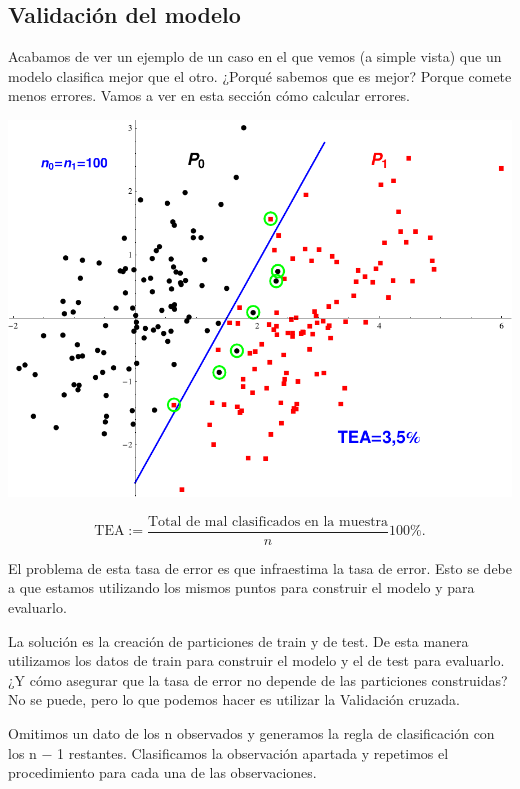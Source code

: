 \subsection{Validación del modelo}

Acabamos de ver un ejemplo de un caso en el que vemos (a simple vista) que un modelo clasifica mejor que el otro. ¿Porqué sabemos que es mejor? Porque comete menos errores. Vamos a ver en esta sección cómo calcular errores.

\centerline{{\includegraphics[width=13 cm]{pdf/tema4/_errores-1}}}

\begin{defn}
$$\text{TEA}:=\frac{\text{Total de mal clasificados en la muestra}}{n}100\%.$$
\end{defn}

El problema de esta tasa de error es que infraestima la tasa de error. Esto se debe a que estamos utilizando los mismos puntos para construir el modelo y para evaluarlo. 

La solución es la creación de particiones de train y de test. De esta manera utilizamos los datos de train para construir el modelo y el de test para evaluarlo. ¿Y cómo asegurar que la tasa de error no depende de las particiones construidas? No se puede, pero lo que podemos hacer es utilizar la Validación cruzada.

\begin{defn}Omitimos un dato de los n observados y generamos la regla de clasificación con los n − 1 restantes. Clasificamos la observación apartada y repetimos el procedimiento para cada una de las observaciones.
\end{defn}


